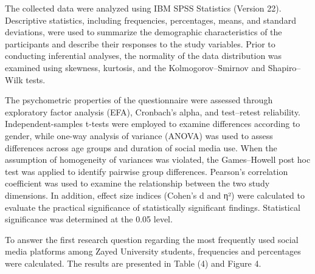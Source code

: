 \documentclass{NSP1}
\begin{document}
The collected data were analyzed using IBM SPSS Statistics (Version 22). Descriptive statistics, including frequencies, percentages, means, and standard deviations, were used to summarize the demographic characteristics of the participants and describe their responses to the study variables. Prior to conducting inferential analyses, the normality of the data distribution was examined using skewness, kurtosis, and the Kolmogorov–Smirnov and Shapiro–Wilk tests.

The psychometric properties of the questionnaire were assessed through exploratory factor analysis (EFA), Cronbach's alpha, and test–retest reliability. Independent-samples t-tests were employed to examine differences according to gender, while one-way analysis of variance (ANOVA) was used to assess differences across age groups and duration of social media use. When the assumption of homogeneity of variances was violated, the Games–Howell post hoc test was applied to identify pairwise group differences. Pearson's correlation coefficient was used to examine the relationship between the two study dimensions. In addition, effect size indices (Cohen's d and η²) were calculated to evaluate the practical significance of statistically significant findings. Statistical significance was determined at the 0.05 level.

\par\vspace{5.0pt}\vspace{5.0pt}

\par\vspace{5.0pt}\vspace{5.0pt}

To answer the first research question regarding the most frequently used social media platforms among Zayed University students, frequencies and percentages were calculated. The results are presented in Table (4) and Figure 4.
\end{document}
